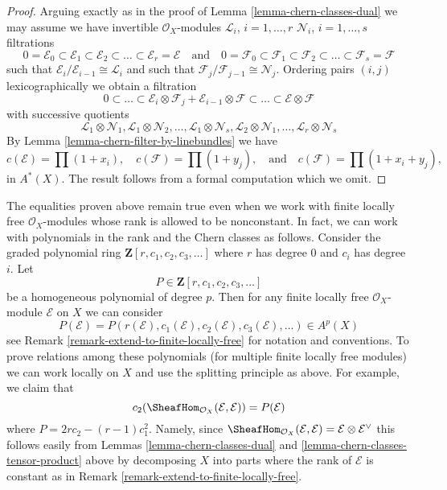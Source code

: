 \begin{proof}
Arguing exactly as in the proof of Lemma \ref{lemma-chern-classes-dual}
we may assume we have
invertible $\mathcal{O}_X$-modules
${\mathcal L}_i$, $i = 1, \ldots, r$
${\mathcal N}_i$, $i = 1, \ldots, s$
filtrations
$$
0 = \mathcal{E}_0 \subset \mathcal{E}_1 \subset \mathcal{E}_2
\subset \ldots \subset \mathcal{E}_r = \mathcal{E}
\quad\text{and}\quad
0 = \mathcal{F}_0 \subset \mathcal{F}_1 \subset \mathcal{F}_2
\subset \ldots \subset \mathcal{F}_s = \mathcal{F}
$$
such that $\mathcal{E}_i/\mathcal{E}_{i - 1} \cong \mathcal{L}_i$
and such that $\mathcal{F}_j/\mathcal{F}_{j - 1} \cong \mathcal{N}_j$.
Ordering pairs $(i, j)$ lexicographically
we obtain a filtration
$$
0 \subset \ldots \subset
\mathcal{E}_i \otimes \mathcal{F}_j
+
\mathcal{E}_{i - 1} \otimes \mathcal{F}
\subset \ldots \subset \mathcal{E} \otimes \mathcal{F}
$$
with successive quotients
$$
\mathcal{L}_1 \otimes \mathcal{N}_1,
\mathcal{L}_1 \otimes \mathcal{N}_2,
\ldots,
\mathcal{L}_1 \otimes \mathcal{N}_s,
\mathcal{L}_2 \otimes \mathcal{N}_1,
\ldots,
\mathcal{L}_r \otimes \mathcal{N}_s
$$
By Lemma \ref{lemma-chern-filter-by-linebundles}
we have
$$
c(\mathcal{E}) = \prod (1 + x_i),
\quad
c(\mathcal{F}) = \prod (1 + y_j),
\quad\text{and}\quad
c(\mathcal{F}) = \prod (1 + x_i + y_j),
$$
in $A^*(X)$. The result follows from a formal computation
which we omit.
\end{proof}

\begin{remark}
\label{remark-equalities-nonconstant-rank}
The equalities proven above remain true even when we work with
finite locally free
$\mathcal{O}_X$-modules whose rank is allowed to be nonconstant.
In fact, we can work with polynomials in the rank and the
Chern classes as follows. Consider the  graded polynomial ring
$\mathbf{Z}[r, c_1, c_2, c_3, \ldots]$
where $r$ has degree $0$ and $c_i$ has degree $i$. Let
$$
P \in \mathbf{Z}[r, c_1, c_2, c_3, \ldots]
$$
be a homogeneous polynomial of degree $p$. Then for any finite locally
free $\mathcal{O}_X$-module $\mathcal{E}$ on $X$ we can consider
$$
P(\mathcal{E}) =
P(r(\mathcal{E}), c_1(\mathcal{E}), c_2(\mathcal{E}), c_3(\mathcal{E}), \ldots)
\in A^p(X)
$$
see Remark \ref{remark-extend-to-finite-locally-free} for notation and
conventions. To prove relations among these polynomials (for multiple
finite locally free modules) we can work locally on $X$ and use the splitting
principle as above. For example, we claim that
$$
c_2(\SheafHom_{\mathcal{O}_X}(\mathcal{E}, \mathcal{E})) =
P(\mathcal{E})
$$
where $P = 2rc_2 - (r - 1)c_1^2$.
Namely, since $\SheafHom_{\mathcal{O}_X}(\mathcal{E}, \mathcal{E}) =
\mathcal{E} \otimes \mathcal{E}^\vee$ this follows easily from
Lemmas \ref{lemma-chern-classes-dual} and
\ref{lemma-chern-classes-tensor-product}
above by decomposing $X$ into parts where the rank
of $\mathcal{E}$ is constant as in
Remark \ref{remark-extend-to-finite-locally-free}.
\end{remark}

